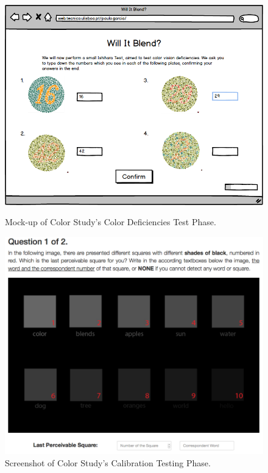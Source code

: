 %
\begin{figure}[htbp]
  \centering
  \begin{minipage}{0.4\textwidth}
		\centering
	  \includegraphics[width=\textwidth]{images/implementation/mockup_ishihara.png}
	  \caption[Mock-up of Color Study's Color Deficiencies Test Phase.]{Mock-up of Color Study's Color Deficiencies Test Phase.}
	  \label{fig:mockup_ishihara}
  \end{minipage} \hfill
	\begin{minipage}{0.4\textwidth}
		\centering
		\includegraphics[width=\textwidth]{images/implementation/screen_calibration.png}
		\caption[Screenshot of Color Study's Calibration Testing Phase.]{Screenshot of Color Study's Calibration Testing Phase.}
		\label{fig:screen_ishihara}
	\end{minipage}
\end{figure} \par
